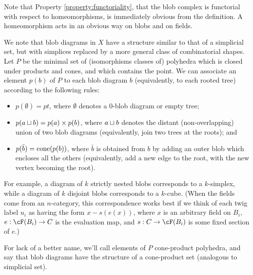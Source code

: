 Note that Property \ref{property:functoriality}, that the blob complex is functorial with respect to homeomorphisms, 
is immediately obvious from the definition.
A homeomorphism acts in an obvious way on blobs and on fields.

\begin{remark} \label{blobsset-remark} \rm
We note that blob diagrams in $X$ have a structure similar to that of a simplicial set,
but with simplices replaced by a more general class of combinatorial shapes.
Let $P$ be the minimal set of (isomorphisms classes of) polyhedra which is closed under products
and cones, and which contains the point.
We can associate an element $p(b)$ of $P$ to each blob diagram $b$ 
(equivalently, to each rooted tree) according to the following rules:
\begin{itemize}
\item $p(\emptyset) = pt$, where $\emptyset$ denotes a 0-blob diagram or empty tree;
\item $p(a \sqcup b) = p(a) \times p(b)$, where $a \sqcup b$ denotes the distant (non-overlapping) union 
of two blob diagrams (equivalently, join two trees at the roots); and
\item $p(\bar{b}) = \operatorname{cone}(p(b))$, where $\bar{b}$ is obtained from $b$ by adding an outer blob which 
encloses all the others (equivalently, add a new edge to the root, with the new vertex becoming the root).
\end{itemize}
For example, a diagram of $k$ strictly nested blobs corresponds to a $k$-simplex, while
a diagram of $k$ disjoint blobs corresponds to a $k$-cube.
(When the fields come from an $n$-category, this correspondence works best if we think of each 
twig label $u_i$ as having the form
$x - s(e(x))$, where $x$ is an arbitrary field on $B_i$, $e: \cF(B_i) \to C$ is the evaluation map, 
and $s:C \to \cF(B_i)$ is some fixed section of $e$.)

For lack of a better name, 
we'll call elements of $P$ cone-product polyhedra, 
and say that blob diagrams have the structure of a cone-product set (analogous to simplicial set).
\end{remark}

